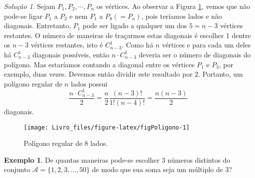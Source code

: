 \documentclass[]{book}
\theoremstyle{definition}
\theoremstyle{definition}
\newtheorem{example}{Exemplo}[chapter]
\theoremstyle{definition}
\theoremstyle{remark}
\newtheorem*{solution}{Solução}
\begin{document}
\begin{solution}
\iffalse{} {Solução. } \fi{}Sejam \(P_1, P_2, \cdots, P_n\) os vértices.
Ao observar a Figura \ref{fig:figPoligono}, vemos que não pode-se ligar \(P_1\) a \(P_2\) e nem \(P_1\) a \(P_8 (=P_n)\), pois teríamos lados e não diagonais.
Entretanto, \(P_1\) pode ser ligado a qualquer um dos \(5 = n-3\) vértices restantes.
O número de maneiras de traçarmos estas diagonais é escolher 1 dentre os \(n-3\) vértices restantes, isto é \(C^{1}_{n-3}\).
Como há \(n\) vértices e para cada um deles há \(C^{1}_{n-3}\) diagonais possíveis, então \(n \cdot C^{1}_{n-3}\) deveria ser o número de diagonais do polígono.
Mas estaríamos contando a diagonal entre os vértices \(P_1\) e \(P_3\), por exemplo, duas vezes.
Devemos então dividir este resultado por \(2\).
Portanto, um polígono regular de \(n\) lados possui
\[ \frac{n \cdot C^{1}_{n-3}}{2} = \frac{n}{2}\frac{(n-3)!}{1!(n-4)!} = \frac{n(n-3)}{2} \]
diagonais.
\end{solution}

\begin{figure}

{\centering \texttt{[image: Livro\_files/figure-latex/figPoligono-1]} 

}

\caption{Polígono regular de 8 lados.}\label{fig:figPoligono}
\end{figure}

\begin{example}
\protect\hypertarget{exm:unnamed-chunk-57}{}{\label{exm:unnamed-chunk-57} }De quantas maneiras pode-se escolher \(3\) números distintos do conjunto \(\mathcal{A}=\{1, 2, 3, \ldots, 50\}\) de modo que sua soma seja um múltiplo de \(3\)?
\end{example}
\end{document}
